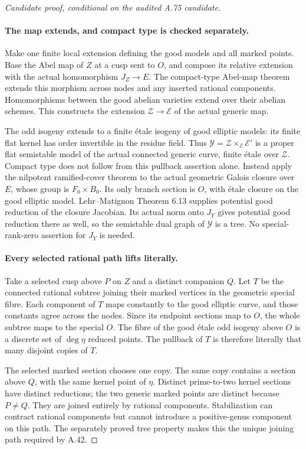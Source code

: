 \begin{proof}[Candidate proof, conditional on the audited A.75 candidate]
\paragraph{The map extends, and compact type is checked separately.}
Make one finite local extension defining the good models
and all marked points. Base the Abel map of \(Z\) at
a cusp sent to \(O\), and compose its relative extension
with the actual homomorphism \(J_Z\to E\). The
compact-type Abel-map theorem extends this morphism
across nodes and any inserted rational components.
\cite[Theorem 1.1 and Proposition 3.2]{fghDupuyRabinoff}
Homomorphisms between the good abelian varieties extend
over their abelian schemes. This constructs the extension
\(\mathcal Z\to\mathcal E\) of the actual generic map.

The odd isogeny extends to a finite \'{e}tale isogeny
of good elliptic models: its finite flat kernel has order
invertible in the residue field. Thus
\(\mathcal Y=\mathcal Z\times_{\mathcal E}\mathcal E'\)
is a proper flat semistable model of the actual connected
generic curve, finite \'{e}tale over \(\mathcal Z\).
Compact type does not follow from this pullback assertion
alone. Instead apply the nilpotent ramified-cover theorem
to the actual geometric Galois closure over \(E\),
whose group is \(F_0\times B_0\). Its only branch
section is \(O\), with \'{e}tale closure on the good
elliptic model. Lehr--Matignon Theorem 6.13 supplies
potential good reduction of the closure Jacobian.
\cite[Theorem 6.13]{fghLehrMatignon2005}
Its actual norm onto \(J_Y\) gives potential good
reduction there as well, so the semistable dual graph
of \(\mathcal Y\) is a tree. No special-rank-zero
assertion for \(J_Y\) is needed.

\paragraph{Every selected rational path lifts literally.}
Take a selected cusp above \(P\) on \(Z\) and a
distinct companion \(Q\). Let \(T\) be the connected
rational subtree joining their marked vertices in the
geometric special fibre. Each component of \(T\) maps
constantly to the good elliptic curve, and those constants
agree across the nodes. Since its endpoint sections map
to \(O\), the whole subtree maps to the special \(O\).
The fibre of the good \'{e}tale odd isogeny above \(O\)
is a discrete set of \(\deg\eta\) reduced points.
The pullback of \(T\) is therefore literally that many
disjoint copies of \(T\).

The selected marked section chooses one copy. The same
copy contains a section above \(Q\), with the same
kernel point of \(\eta\). Distinct prime-to-two kernel
sections have distinct reductions; the two generic marked
points are distinct because \(P\ne Q\). They are
joined entirely by rational components. Stabilization
can contract rational components but cannot introduce a
positive-genus component on this path. The separately
proved tree property makes this the unique joining path
required by A.42.


\end{proof}
